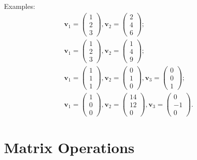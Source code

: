 \documentclass[
  12pt,
  oneside,openany]{book}
\begin{document}
Examples:
\[
\begin{gathered}
\mathbf{v}_1 = \begin{pmatrix} 1 \\ 2 \\ 3 \end{pmatrix},
\mathbf{v}_2 = \begin{pmatrix} 2 \\ 4 \\ 6 \end{pmatrix}; \\
\mathbf{v}_1 = \begin{pmatrix} 1 \\ 2 \\ 3 \end{pmatrix},
\mathbf{v}_2 = \begin{pmatrix} 1 \\ 4 \\ 9 \end{pmatrix}; \\
\mathbf{v}_1 = \begin{pmatrix} 1 \\ 1 \\ 1 \end{pmatrix},
\mathbf{v}_2 = \begin{pmatrix} 0 \\ 1 \\ 0 \end{pmatrix},
\mathbf{v}_3 = \begin{pmatrix} 0 \\ 0 \\ 1 \end{pmatrix}; \\
\mathbf{v}_1 = \begin{pmatrix} 1 \\ 0 \\ 0 \end{pmatrix},
\mathbf{v}_2 = \begin{pmatrix} 14 \\ 12 \\ 0 \end{pmatrix},
\mathbf{v}_3 = \begin{pmatrix} 0 \\ -1 \\ 0 \end{pmatrix}.
\end{gathered}
\]

\hypertarget{matrix-operations}{%
\section{Matrix Operations}\label{matrix-operations}}
\end{document}
